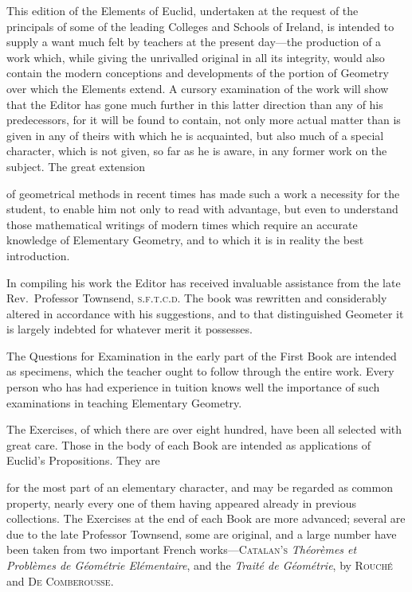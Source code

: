 \documentclass[oneside]{book}
\begin{document}
\noindent This edition of the Elements of Euclid, undertaken
at the request of the principals of some of
the leading Colleges and Schools of Ireland, is
intended to supply a want much felt by teachers
at the present day---the production of a work
which, while giving the unrivalled original in
all its integrity, would also contain the modern
conceptions and developments of the portion of
Geometry over which the Elements extend. A
cursory examination of the work will show that
the Editor has gone much further in this latter
direction than any of his predecessors, for it will
be found to contain, not only more actual matter
than is given in any of theirs with which he is
acquainted, but also much of a special character,
which is not given, so far as he is aware, in any
former work on the subject. The great extension

of geometrical methods in recent times has made
such a work a necessity for the student, to enable
him not only to read with advantage, but even to
understand those mathematical writings of modern
times which require an accurate knowledge
of Elementary Geometry, and to which it is in
reality the best introduction.

In compiling his work the Editor has received
invaluable assistance from the late Rev.\ Professor
Townsend, \textsc{s.f.t.c.d.} The book was rewritten
and considerably altered in accordance with his
suggestions, and to that distinguished Geometer
it is largely indebted for whatever merit it possesses.

The Questions for Examination in the early part
of the First Book are intended as specimens,
which the teacher ought to follow through the
entire work. Every person who has had experience
in tuition knows well the importance
of such examinations in teaching Elementary
Geometry.

The Exercises, of which there are over eight
hundred, have been all selected with great care.
Those in the body of each Book are intended as
applications of Euclid's Propositions. They are

for the most part of an elementary character, and
may be regarded as common property, nearly
every one of them having appeared already in
previous collections. The Exercises at the end
of each Book are more advanced; several are
due to the late Professor Townsend, some are
original, and a large number have been taken
from two important French works---\textsc{Catalan's}
\textit{Théorèmes et Problèmes de Géométrie Elémentaire},
and the \textit{Traité de Géométrie}, by \textsc{Rouché} and
\textsc{De Comberousse}.
\end{document}

